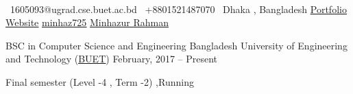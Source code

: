 \documentclass[]{awesome-cv}
\begin{document}
    
\begin{center}
	  \\
	\vspace{2mm}
	{\faEnvelope\ 1605093@ugrad.cse.buet.ac.bd} \hspace{5mm} {\faMobile\ +8801521487070}  \hspace{5mm} {\faMapMarker\ Dhaka , Bangladesh} \hspace{5mm} {\faLink\href{www.minhazrahman.com}{\underline{Portfolio Website}}} {\faGithub \href{https://github.com/minhaz725}{\underline{minhaz725}}} \hspace{20mm} {\faLinkedin \href{https://www.linkedin.com/in/minhaz725/}{\underline{Minhazur Rahman}}}
\end{center}
\begin{cventries}
	\cventry
	{BSC in Computer Science and Engineering }
	{Bangladesh University of Engineering and Technology (\href{https://www.buet.ac.bd/}{\underline{BUET}})}
	{February, 2017 – Present}
	{}
	{\begin{cvitems}
			\item {Final semester (Level -4 , Term -2) ,Running}
	\end{cvitems}}
\end{cventries}

\vspace{-4mm}
\end{document}
